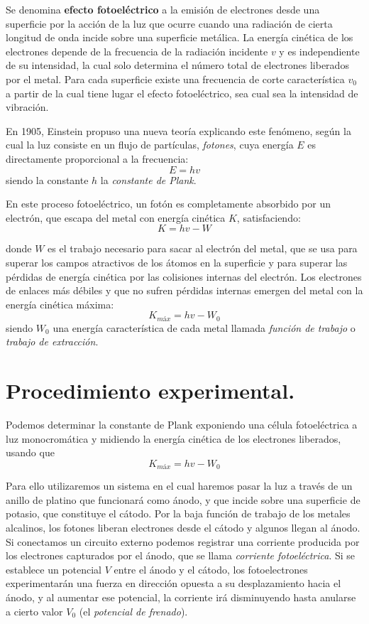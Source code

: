 \documentclass[a4paper,12pt,spanish]{article}
\begin{document}
	Se denomina \textbf{efecto fotoeléctrico} a la emisión de electrones desde una superficie por la acción de la luz que ocurre cuando una radiación de cierta longitud de onda incide sobre una superficie metálica. La energía cinética de los electrones depende de la frecuencia de  la radiación incidente $v$ y es independiente de su intensidad, la cual solo determina el número total de electrones liberados por el metal. Para cada superficie existe una frecuencia de corte característica $v_0$ a partir de la cual tiene lugar el efecto fotoeléctrico, sea cual sea la intensidad de vibración. 
	
	En 1905, Einstein propuso una nueva teoría explicando este fenómeno, según la cual la luz consiste en un flujo de partículas, \textit{fotones}, cuya  energía $E$ es directamente proporcional a la frecuencia:
	\[ E = hv
	\]
	siendo la constante $h$ la \textit{constante de Plank}.
	
	En este proceso fotoeléctrico, un fotón es completamente absorbido por un electrón, que escapa del metal con energía cinética $K$, satisfaciendo:
	\[ K = hv - W
	\]
	
	donde $W$ es el  trabajo necesario para sacar al electrón del metal, que se usa para superar los campos atractivos de los átomos en la superficie y para superar las pérdidas de energía cinética por las colisiones internas del electrón. Los electrones de enlaces más débiles y que no sufren pérdidas internas emergen del metal con la energía cinética máxima: 
	\[ K_{máx} = hv - W_0
	\]
	siendo $W_0$ una energía característica de cada metal llamada \textit{función de trabajo} o \textit{trabajo de extracción}.
	
	
	
	
	
	
	\section{Procedimiento experimental.}
	
	
	Podemos determinar la constante de Plank exponiendo una célula fotoeléctrica a luz monocromática y midiendo la energía cinética de los electrones liberados, usando que
	\[ K_{máx} = hv - W_0
	\]
	
	Para ello utilizaremos un sistema en el cual haremos pasar la luz a través de un anillo de platino que funcionará como ánodo, y que incide sobre una superficie de potasio, que constituye el cátodo. Por la baja función de trabajo de los metales alcalinos, los fotones liberan electrones desde el cátodo y algunos llegan al ánodo. Si conectamos un circuito externo podemos registrar una corriente producida por los electrones capturados por el ánodo, que se llama \textit{corriente fotoeléctrica}. Si se establece un potencial $V$ entre el ánodo y el cátodo, los fotoelectrones experimentarán una fuerza en dirección opuesta a su desplazamiento hacia el ánodo, y al aumentar ese potencial, la corriente irá disminuyendo hasta anularse a cierto valor $V_0$ (el \textit{potencial de frenado}). 
	
\end{document}
